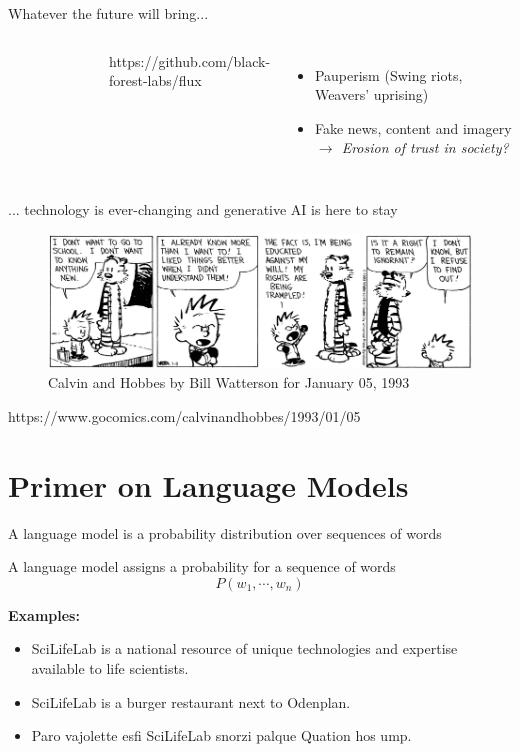\documentclass[10pt]{beamer}
\newcommand{\credit}[1]{{\par \raggedleft \scriptsize \mdseries \color{mDarkBrown} #1 \par}}
\newcommand{\creditdark}[1]{{\par \raggedleft \scriptsize \mdseries \color{scMGray} #1 \par}}
\begin{document}
\begin{frame}[standout]{Whatever the future will bring...}
\begin{columns}[T,onlytextwidth]
\begin{figure}
		\end{figure}
			\creditdark{https://github.com/black-forest-labs/flux}
				\begin{itemize}
				\item Pauperism (Swing riots, Weavers' uprising)
				\item Fake news, content and imagery\vspace{0.5cm} \linebreak 
						\emph{$\rightarrow$ Erosion of trust in society?}
			\end{itemize}
	\end{columns}
\end{frame}


\begin{frame}{... technology is ever-changing and generative AI is here to stay}
\begin{figure}
	\includegraphics[width=\textwidth]{figures/IgnorantCalvin.jpg}
	\caption{Calvin and Hobbes by Bill Watterson for January 05, 1993}
\end{figure}
\credit{https://www.gocomics.com/calvinandhobbes/1993/01/05}
\end{frame}


\section{Primer on Language Models}



\begin{frame}{A language model is a probability distribution over sequences of words}
		\begin{exampleblock}{A language model}
			assigns a probability for a sequence of words
			$$
			P(w_1, \cdots, w_{n})
			$$
		\end{exampleblock}
		\textbf{Examples:}
			\begin{itemize}
				\item SciLifeLab is a national resource of unique technologies and expertise available to life scientists.
				\item SciLifeLab is a burger restaurant next to Odenplan.
				\item Paro vajolette esfi SciLifeLab snorzi palque Quation hos ump.
			\end{itemize}
\end{frame}
\end{document}
